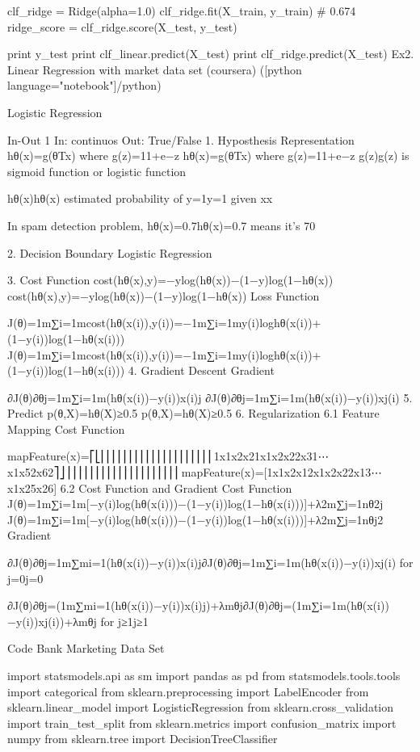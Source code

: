 clf_ridge = Ridge(alpha=1.0)
clf_ridge.fit(X_train, y_train)
# 0.674
ridge_score = clf_ridge.score(X_test, y_test)

print y_test
print clf_linear.predict(X_test)
print clf_ridge.predict(X_test)
Ex2. Linear Regression with market data set (coursera) ([python language="notebook"]/python)

Logistic Regression


In-Out 1
In: continuos
Out: True/False
1. Hyposthesis Representation
hθ(x)=g(θTx) where g(z)=11+e−z
hθ(x)=g(θTx) where g(z)=11+e−z
g(z)g(z) is sigmoid function or logistic function

hθ(x)hθ(x) estimated probability of y=1y=1 given xx

In spam detection problem, hθ(x)=0.7hθ(x)=0.7 means it's 70%

2. Decision Boundary
Logistic Regression

3. Cost Function
cost(hθ(x),y)=−ylog(hθ(x))−(1−y)log(1−hθ(x))
cost(hθ(x),y)=−ylog(hθ(x))−(1−y)log(1−hθ(x))
Loss Function

J(θ)=1m∑i=1mcost(hθ(x(i)),y(i))=−1m∑i=1my(i)loghθ(x(i))+(1−y(i))log(1−hθ(x(i)))
J(θ)=1m∑i=1mcost(hθ(x(i)),y(i))=−1m∑i=1my(i)loghθ(x(i))+(1−y(i))log(1−hθ(x(i)))
4. Gradient Descent
Gradient

∂J(θ)∂θj=1m∑i=1m(hθ(x(i))−y(i))x(i)j
∂J(θ)∂θj=1m∑i=1m(hθ(x(i))−y(i))xj(i)
5. Predict
p(θ,X)=hθ(X)≥0.5
p(θ,X)=hθ(X)≥0.5
6. Regularization
6.1 Feature Mapping
Cost Function

mapFeature(x)=⎡⎣⎢⎢⎢⎢⎢⎢⎢⎢⎢⎢⎢⎢⎢⎢⎢⎢⎢⎢⎢⎢1x1x2x21x1x2x22x31⋯x1x52x62⎤⎦⎥⎥⎥⎥⎥⎥⎥⎥⎥⎥⎥⎥⎥⎥⎥⎥⎥⎥⎥⎥
mapFeature(x)=[1x1x2x12x1x2x22x13⋯x1x25x26]
6.2 Cost Function and Gradient
Cost Function
J(θ)=1m∑i=1m[−y(i)log(hθ(x(i)))−(1−y(i))log(1−hθ(x(i)))]+λ2m∑j=1nθ2j
J(θ)=1m∑i=1m[−y(i)log(hθ(x(i)))−(1−y(i))log(1−hθ(x(i)))]+λ2m∑j=1nθj2
Gradient

∂J(θ)∂θj=1m∑mi=1(hθ(x(i))−y(i))x(i)j∂J(θ)∂θj=1m∑i=1m(hθ(x(i))−y(i))xj(i) for j=0j=0

∂J(θ)∂θj=(1m∑mi=1(hθ(x(i))−y(i))x(i)j)+λmθj∂J(θ)∂θj=(1m∑i=1m(hθ(x(i))−y(i))xj(i))+λmθj for j≥1j≥1

Code
Bank Marketing Data Set

import statsmodels.api as sm
import pandas as pd
from statsmodels.tools.tools import categorical
from sklearn.preprocessing import LabelEncoder
from sklearn.linear_model import LogisticRegression
from sklearn.cross_validation import train_test_split
from sklearn.metrics import confusion_matrix
import numpy
from sklearn.tree import DecisionTreeClassifier


